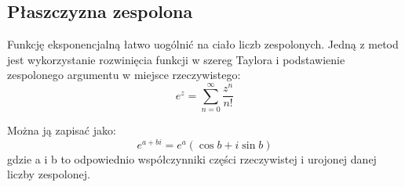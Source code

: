\documentclass{article}
\begin{document}
\subsection*{Płaszczyzna zespolona}
Funkcję eksponencjalną łatwo uogólnić na ciało liczb zespolonych. Jedną z metod jest wykorzystanie rozwinięcia funkcji w szereg Taylora i podstawienie zespolonego argumentu w miejsce rzeczywistego:
\[ e^{z}=\sum _{n=0}^{\infty }{\frac {z^{n}}{n!}} \]

Można ją zapisać jako: 
$$ e^{a+bi}=e^{a}(\cos b+i\sin b) $$
gdzie a i b to odpowiednio współczynniki części rzeczywistej i urojonej danej liczby zespolonej. 
\end{document}
